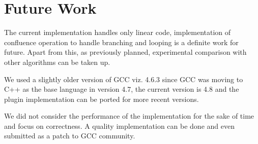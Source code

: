 \chapter{Future Work}

The current implementation handles only linear code, implementation of confluence operation to handle branching and looping is a definite work for future. Apart from this, as previously planned, experimental comparison with other algorithms can be taken up.

We used a slightly older version of GCC viz. 4.6.3 since GCC was moving to C++ as the base language in version 4.7, the current version is 4.8 and the plugin implementation can be ported for more recent versions.

We did not consider the performance of the implementation for the sake of time and focus on correctness. A quality implementation can be done and even submitted as a patch to GCC community. 
